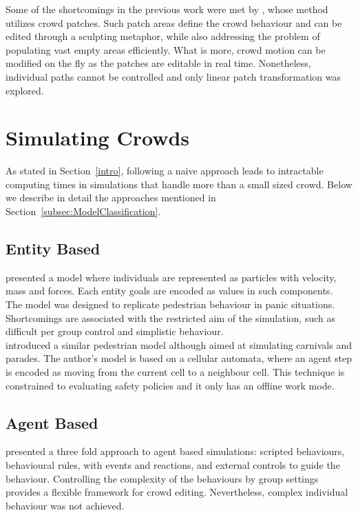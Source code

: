 \documentclass[6pt]{article} %
\begin{document}
\begin{multicols}{2}
Some of the shortcomings in the previous work were met by \cite{Jordao2014}, whose method utilizes crowd patches.
Such patch areas define the crowd behaviour and can be edited through a sculpting metaphor, while also addressing the problem of populating vast empty areas efficiently.
What is more, crowd motion can be modified on the fly as the patches are editable in real time.
Nonetheless, individual paths cannot be controlled and only linear patch transformation was explored.

\section{Simulating Crowds}

As stated in Section~\ref{intro}, following a naive approach leads to intractable computing times in simulations that handle more than a small sized crowd.
Below we describe in detail the approaches mentioned in Section~\ref{subsec:ModelClassification}. 

\subsection{Entity Based}

\cite{Helbing2000} presented a model where individuals are represented as particles with velocity, mass and forces.
Each entity goals are encoded as values in such components.
The model was designed to replicate pedestrian behaviour in panic situations.
Shortcomings are associated with the restricted aim of the simulation, such as difficult per group control and simplistic behaviour.\\

\cite{batty2003} introduced a similar pedestrian model although aimed at simulating carnivals and parades.
The author's model is based on a cellular automata, where an agent step is encoded as moving from the current cell to a neighbour cell.
This technique is constrained to evaluating safety policies and it only has an offline work mode.

\subsection{Agent Based}

\cite{raupp2001} presented a three fold approach to agent based simulations: scripted behaviours, behavioural rules, with events and reactions, and external controls to guide the behaviour.
Controlling the complexity of the behaviours by group settings provides a flexible framework for crowd editing.
Nevertheless, complex individual behaviour was not achieved.\\


\end{multicols}
\end{document}

